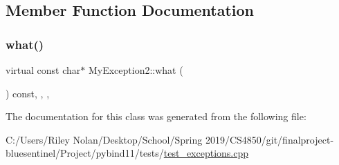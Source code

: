 \subsection{Member Function Documentation}
\mbox{\label{class_my_exception2_ad95b36834ea0385941bbd577dd3785d7}} 
\subsubsection{\texorpdfstring{what()}{what()}}
{\footnotesize\ttfamily virtual const char$\ast$ My\+Exception2\+::what (\begin{DoxyParamCaption}{ }\end{DoxyParamCaption}) const\hspace{0.3cm}{\ttfamily [inline]}, {\ttfamily [override]}, {\ttfamily [virtual]}, {\ttfamily [noexcept]}}



The documentation for this class was generated from the following file\+:\begin{DoxyCompactItemize}
\item 
C\+:/\+Users/\+Riley Nolan/\+Desktop/\+School/\+Spring 2019/\+C\+S4850/git/finalproject-\/bluesentinel/\+Project/pybind11/tests/\mbox{\hyperlink{test__exceptions_8cpp}{test\+\_\+exceptions.\+cpp}}\end{DoxyCompactItemize}
